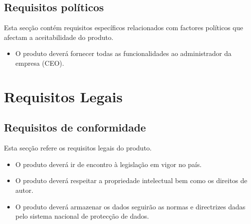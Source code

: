 \subsection{Requisitos políticos}
Esta secção contém requisitos específicos relacionados com factores políticos que afectam a aceitabilidade do produto.
\begin{itemize}
\item O produto deverá fornecer todas as funcionalidades ao administrador da empresa (CEO).
\end{itemize}

\section{Requisitos Legais}
\subsection{Requisitos de conformidade}

Esta secção refere os requisitos legais do produto.
\begin{itemize}
\item O produto deverá ir de encontro à legislação em vigor no país.
\item O produto deverá respeitar a propriedade intelectual bem como os direitos de autor.
\item O produto deverá armazenar os dados seguirão as normas e directrizes dadas pelo sistema nacional de protecção de dados.
\end{itemize}

